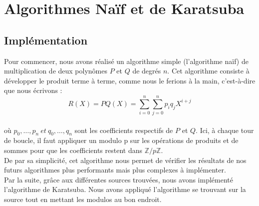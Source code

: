 \documentclass[12pt, a4paper]{article}
\begin{document}
\newpage

\section{Algorithmes Naïf et de Karatsuba}
\subsection{Implémentation}

Pour commencer, nous avons réalisé un algorithme simple (l'algorithme naïf) de multiplication de deux polynômes $P$ et $Q$ de degrés $n$. Cet algorithme consiste à développer le produit terme à terme, comme nous le ferions à la main, c'est-à-dire que nous écrivons : \\
\[R(X) = PQ(X) =
\displaystyle\sum_{i=0}^{n}\sum_{j=0}^{n} p_i q_j X^{i+j}\] \\
où $p_0,\dots,p_n\ et\ q_0,\dots,q_n$ sont les coefficients respectifs de $P$ et $Q$. Ici, à chaque tour de boucle, il faut appliquer un modulo p sur les opérations de produits et de sommes pour que les coefficients restent dans $\mathbb{Z}/p\mathbb{Z}$.\\
De par sa simplicité, cet algorithme nous permet de vérifier les résultats de nos futurs algorithmes plus performants mais plus complexes à implémenter.\\
Par la suite, grâce aux différentes sources 
trouvées, nous avons implémenté l'algorithme de Karatsuba. Nous avons appliqué l'algorithme se trouvant sur la source \cite{Karatsuba} tout en mettant les modulos au bon endroit.
\end{document}
